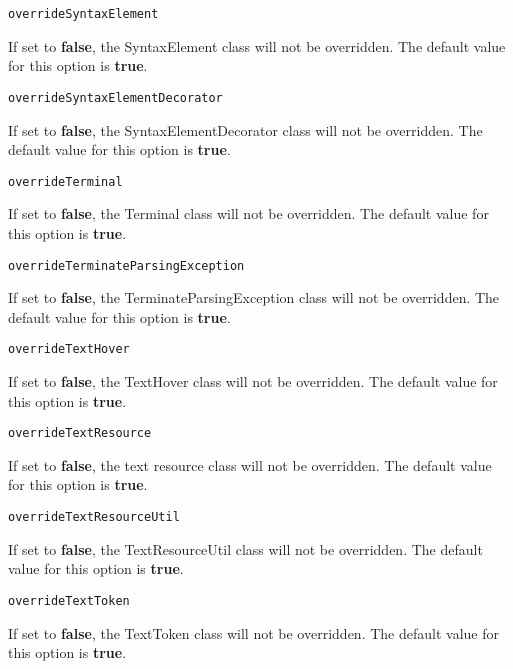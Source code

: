 \noindent\texttt{overrideSyntaxElement}
\begin{myindentpar}{1cm}
If set to \textbf{false}, the SyntaxElement class will not be overridden. The default value for this option is \textbf{true}.
\end{myindentpar}

\noindent\texttt{overrideSyntaxElementDecorator}
\begin{myindentpar}{1cm}
If set to \textbf{false}, the SyntaxElementDecorator class will not be overridden. The default value for this option is \textbf{true}.
\end{myindentpar}

\noindent\texttt{overrideTerminal}
\begin{myindentpar}{1cm}
If set to \textbf{false}, the Terminal class will not be overridden. The default value for this option is \textbf{true}.
\end{myindentpar}

\noindent\texttt{overrideTerminateParsingException}
\begin{myindentpar}{1cm}
If set to \textbf{false}, the TerminateParsingException class will not be overridden. The default value for this option is \textbf{true}.
\end{myindentpar}

\noindent\texttt{overrideTextHover}
\begin{myindentpar}{1cm}
If set to \textbf{false}, the TextHover class will not be overridden. The default value for this option is \textbf{true}.
\end{myindentpar}

\noindent\texttt{overrideTextResource}
\begin{myindentpar}{1cm}
If set to \textbf{false}, the text resource class will not be overridden. The default value for this option is \textbf{true}.
\end{myindentpar}

\noindent\texttt{overrideTextResourceUtil}
\begin{myindentpar}{1cm}
If set to \textbf{false}, the TextResourceUtil class will not be overridden. The default value for this option is \textbf{true}.
\end{myindentpar}

\noindent\texttt{overrideTextToken}
\begin{myindentpar}{1cm}
If set to \textbf{false}, the TextToken class will not be overridden. The default value for this option is \textbf{true}.
\end{myindentpar}

